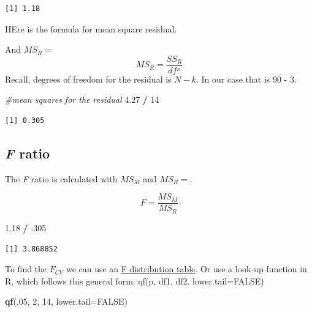 \documentclass[
  11pt,
]{book}
\newenvironment{Shaded}{\begin{snugshade}}{\end{snugshade}}
\newcommand{\AttributeTok}[1]{\textcolor[rgb]{0.27,0.27,0.27}{#1}}
\newcommand{\CommentTok}[1]{\textcolor[rgb]{0.37,0.37,0.37}{\textit{#1}}}
\newcommand{\ConstantTok}[1]{\textcolor[rgb]{0.37,0.37,0.37}{#1}}
\newcommand{\DecValTok}[1]{\textcolor[rgb]{0.06,0.06,0.06}{#1}}
\newcommand{\FloatTok}[1]{\textcolor[rgb]{0.06,0.06,0.06}{#1}}
\newcommand{\FunctionTok}[1]{\textcolor[rgb]{0.27,0.27,0.27}{\textbf{#1}}}
\newcommand{\NormalTok}[1]{#1}
\newcommand{\SpecialCharTok}[1]{\textcolor[rgb]{0.43,0.43,0.43}{\textbf{#1}}}
\begin{document}
\begin{verbatim}
[1] 1.18
\end{verbatim}

HEre is the formula for mean square residual.

And \(MS_R=\) \[MS_R = \frac{SS_{R}}{df^{_{R}}}\] Recall, degrees of freedom for the residual is \(N - k\). In our case that is 90 - 3.

\begin{Shaded}
\begin{Highlighting}[]
\CommentTok{\#mean squares for the residual}
\FloatTok{4.27} \SpecialCharTok{/} \DecValTok{14}
\end{Highlighting}
\end{Shaded}

\begin{verbatim}
[1] 0.305
\end{verbatim}

\hypertarget{f-ratio}{%
\subsection{\texorpdfstring{\emph{F} ratio}{F ratio}}\label{f-ratio}}

The \emph{F} ratio is calculated with \(MS_M\) and \(MS_R=\).

\[F = \frac{MS_{M}}{MS_{R}}\]

\begin{Shaded}
\begin{Highlighting}[]
\FloatTok{1.18} \SpecialCharTok{/}\NormalTok{ .}\DecValTok{305}
\end{Highlighting}
\end{Shaded}

\begin{verbatim}
[1] 3.868852
\end{verbatim}

To find the \(F_{CV}\) we can use an \href{https://www.statology.org/f-distribution-table/}{F distribution table}. Or use a look-up function in R, which follows this general form: qf(p, df1, df2. lower.tail=FALSE)

\begin{Shaded}
\begin{Highlighting}[]
\FunctionTok{qf}\NormalTok{(.}\DecValTok{05}\NormalTok{, }\DecValTok{2}\NormalTok{, }\DecValTok{14}\NormalTok{, }\AttributeTok{lower.tail=}\ConstantTok{FALSE}\NormalTok{)}
\end{Highlighting}
\end{Shaded}
\end{document}
